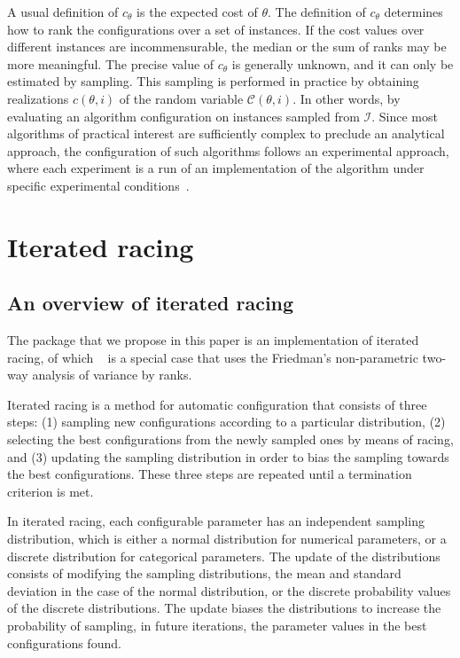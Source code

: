 \documentclass[article,a4paper,nojss,notitle]{jss}
\newcommand{\irace}{\pkg{irace}\xspace}
\newcommand{\IFRACE}{\text{I/F-Race}\xspace}
\begin{document}
A usual definition of $c_\theta$ is %
the expected cost of $\theta$. The definition of $c_\theta$
determines how to rank the configurations over a set of instances. If
the cost values over different instances are incommensurable, the
median or the sum of ranks may be more meaningful. The precise value
of $c_\theta$ is generally unknown, and it can only be estimated by
sampling. %
This sampling is performed in
practice by obtaining realizations $c(\theta, i)$ of the random
variable $\mathcal{C}(\theta, i)$. In other words, by evaluating an
algorithm configuration on instances sampled from $\mathcal{I}$.
% 
Since most algorithms of practical interest are sufficiently complex
to preclude an analytical approach, the configuration of such
algorithms follows an experimental approach, where each experiment is
a run of an implementation of the algorithm under specific experimental
conditions~\citep{Bar2006newexp}.
%


\section{Iterated racing}\label{sec:iterated_racing}

\subsection{An overview of iterated racing} %

The \irace package that we propose in this paper is an implementation
of iterated racing, of which
\IFRACE~\citep{BalBirStu07,BirYuaBal2010:emaoa} is a special case that
uses the Friedman's non-parametric two-way analysis of variance by
ranks.

Iterated racing is a method for
automatic configuration that consists of three steps: (1) sampling new
configurations according to a particular distribution, (2) selecting
the best configurations from the newly sampled ones by means of
racing, and (3) updating the sampling distribution in order to bias
the sampling towards the best configurations. These three steps are
repeated until a termination criterion is met.

In iterated racing, each configurable parameter has an independent
sampling distribution, which is either a normal distribution for
numerical parameters, or a discrete distribution for categorical
parameters. The update of the distributions consists of modifying the
sampling distributions, the mean and standard deviation in the case of
the normal distribution, or the discrete probability values of the
discrete distributions. The update biases the distributions to
increase the probability of sampling, in future iterations, the
parameter values in the best configurations found.
\end{document}
